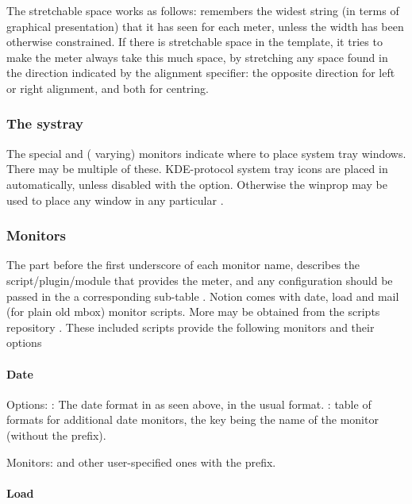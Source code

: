 The stretchable space works as follows:  remembers
the widest string (in terms of graphical presentation) that it has
seen for each meter, unless the width has been otherwise constrained.
If there is stretchable space in the template, it tries to make the
meter always take this much space, by stretching any space found in
the direction indicated by the alignment specifier: the opposite
direction for left or right alignment, and both for centring.

\subsubsection{The systray}

The special  and 
(\codestr{*} varying) monitors indicate where to place system tray 
windows.  There may be multiple of these. KDE-protocol system tray
icons are placed in  automatically, unless disabled 
with the  option. Otherwise the  winprop may
be used to place any window in any particular .

\subsubsection{Monitors}

The part before the first
underscore of each monitor name, describes the script/plugin/module
that provides the meter, and any configuration should be passed
in the a corresponding sub-table .
Notion comes with date, load and mail (for plain old mbox) 
 monitor scripts. More may be obtained from 
the scripts repository \cite{scripts}. These included scripts 
provide the following monitors and their options

\paragraph{Date}

Options: : The date format in as seen above, 
in the usual  format. : table of
formats for additional date monitors, the key being the name
of the monitor (without the  prefix).

Monitors:  and other user-specified ones with the
 prefix.


\paragraph{Load}

